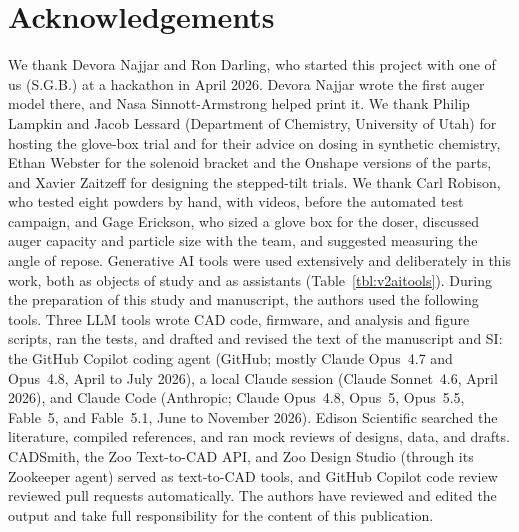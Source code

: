 \documentclass[twoside,twocolumn,9pt]{article}
\renewcommand{\refname}{Notes and references}
\begin{document}
\section*{Acknowledgements}
We thank Devora Najjar and Ron Darling, who started this project with one of us (S.G.B.) at a hackathon in April 2026. Devora Najjar wrote the first auger model there, and Nasa Sinnott-Armstrong helped print it. We thank Philip Lampkin and Jacob Lessard (Department of Chemistry, University of Utah) for hosting the glove-box trial and for their advice on dosing in synthetic chemistry, Ethan Webster for the solenoid bracket and the Onshape versions of the parts, and Xavier Zaitzeff for designing the stepped-tilt trials. We thank Carl Robison, who tested eight powders by hand, with videos, before the automated test campaign, and Gage Erickson, who sized a glove box for the doser, discussed auger capacity and particle size with the team, and suggested measuring the angle of repose. Generative AI tools were used extensively and deliberately in this work, both as objects of study and as assistants (Table~\ref{tbl:v2aitools}). During the preparation of this study and manuscript, the authors used the following tools. Three LLM tools wrote CAD code, firmware, and analysis and figure scripts, ran the tests, and drafted and revised the text of the manuscript and SI: the GitHub Copilot coding agent (GitHub; mostly Claude Opus~4.7 and Opus~4.8, April to July 2026), a local Claude session (Claude Sonnet~4.6, April 2026), and Claude Code (Anthropic; Claude Opus~4.8, Opus~5, Opus~5.5, Fable~5, and Fable~5.1, June to November 2026). Edison Scientific searched the literature, compiled references, and ran mock reviews of designs, data, and drafts. CADSmith, the Zoo Text-to-CAD API, and Zoo Design Studio (through its Zookeeper agent) served as text-to-CAD tools, and GitHub Copilot code review reviewed pull requests automatically. The authors have reviewed and edited the output and take full responsibility for the content of this publication.

\balance

\renewcommand\refname{Notes and references}



\end{document}
